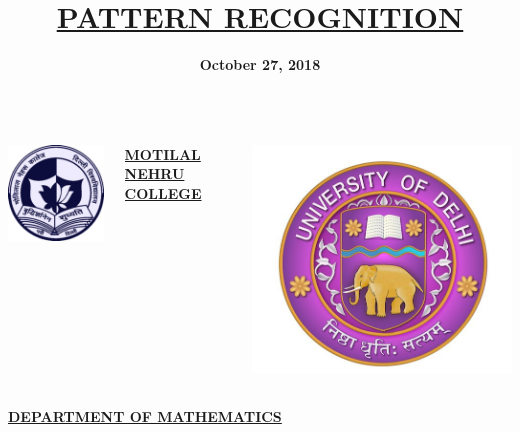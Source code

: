 \documentclass{beamer}
\author[Team PattReco5]{}
\institute{\bf A PRESENTATION TOPIC BELONGS TO LATEX }
\title{\bf \underline{PATTERN RECOGNITION}}
\date{\bf{October 27, 2018}}
\begin{document}
\begin{frame}
\transwipe

\begin{columns}


\begin{column}{.35\textwidth}
\hspace{1.cm}
\includegraphics[width=.35\textwidth]{mlnc.png}%
\end{column}


\begin{column}{.6\textwidth}
{\bf \underline{MOTILAL NEHRU COLLEGE }}\\ 
\end{column}


\begin{column}{.4\textwidth}
\includegraphics[width=.4\textwidth]{du.jpg}%
\end{column}


\end{columns}
\hspace{2.2cm} {\bf \underline{DEPARTMENT OF MATHEMATICS }}\\


\titlepage


\end{frame}
\end{document}
